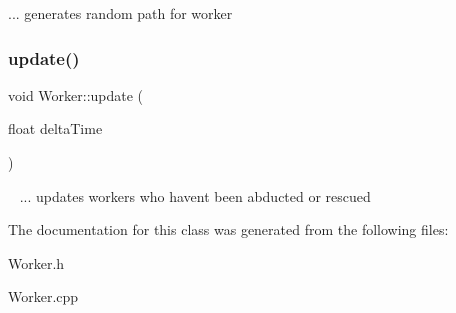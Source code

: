 ... generates random path for worker\mbox{\label{class_worker_ad79617e69aff5ed4a22835f5e2b3cf7a}} 
\subsubsection{\texorpdfstring{update()}{update()}}
{\footnotesize\ttfamily void Worker\+::update (\begin{DoxyParamCaption}\item[{float}]{delta\+Time }\end{DoxyParamCaption})}

~\newline
... updates workers who havent been abducted or rescued

The documentation for this class was generated from the following files\+:\begin{DoxyCompactItemize}
\item 
Worker.\+h\item 
Worker.\+cpp\end{DoxyCompactItemize}
